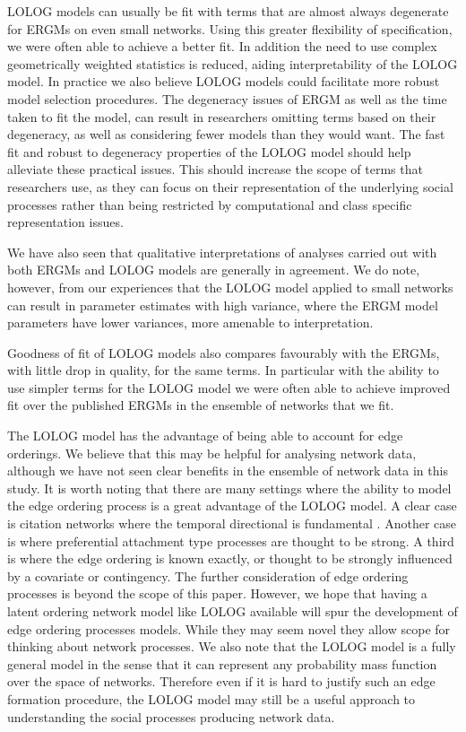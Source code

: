\documentclass[
]{statsoc}
\begin{document}
LOLOG models can usually be fit with terms that are almost always
degenerate for ERGMs on even small networks. Using this greater
flexibility of specification, we were often able to achieve a better
fit. In addition the need to use complex geometrically weighted
statistics is reduced, aiding interpretability of the LOLOG model. In
practice we also believe LOLOG models could facilitate more robust model
selection procedures. The degeneracy issues of ERGM as well as the time
taken to fit the model, can result in researchers omitting terms based
on their degeneracy, as well as considering fewer models than they would
want. The fast fit and robust to degeneracy properties of the LOLOG
model should help alleviate these practical issues. This should increase
the scope of terms that researchers use, as they can focus on their
representation of the underlying social processes rather than being
restricted by computational and class specific representation issues.

We have also seen that qualitative interpretations of analyses carried
out with both ERGMs and LOLOG models are generally in agreement. We do
note, however, from our experiences that the LOLOG model applied to
small networks can result in parameter estimates with high variance,
where the ERGM model parameters have lower variances, more amenable to
interpretation.

Goodness of fit of LOLOG models also compares favourably with the ERGMs,
with little drop in quality, for the same terms. In particular with the
ability to use simpler terms for the LOLOG model we were often able to
achieve improved fit over the published ERGMs in the ensemble of
networks that we fit.

The LOLOG model has the advantage of being able to account for edge
orderings. We believe that this may be helpful for analysing network
data, although we have not seen clear benefits in the ensemble of
network data in this study. It is worth noting that there are many
settings where the ability to model the edge ordering process is a great
advantage of the LOLOG model. A clear case is citation networks where
the temporal directional is fundamental \citep{McLeveyetal2018}. Another
case is where preferential attachment type processes are thought to be
strong. A third is where the edge ordering is known exactly, or thought
to be strongly influenced by a covariate or contingency. The further
consideration of edge ordering processes is beyond the scope of this
paper. However, we hope that having a latent ordering network model like
LOLOG available will spur the development of edge ordering processes
models. While they may seem novel they allow scope for thinking about
network processes. We also note that the LOLOG model is a fully general
model in the sense that it can represent any probability mass function
over the space of networks. Therefore even if it is hard to justify such
an edge formation procedure, the LOLOG model may still be a useful
approach to understanding the social processes producing network data.
\end{document}

